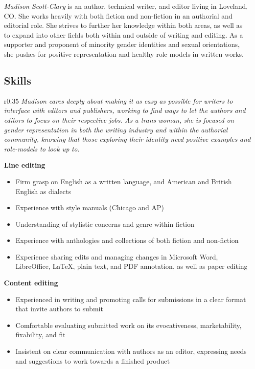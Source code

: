\documentclass[letterpaper]{memoir}
\begin{document}


\textit{\large Madison Scott-Clary} is an author, technical writer, and editor living in Loveland, CO. She works heavily with both fiction and non-fiction in an authorial and editorial role. She strives to further her knowledge within both areas, as well as to expand into other fields both within and outside of writing and editing. As a supporter and proponent of minority gender identities and sexual orientations, she pushes for positive representation and healthy role models in written works.

\subsection{Skills}

\begin{wrapfigure}{r}{0.35\linewidth}
  \textit{\color{titlegreydark} \large Madison cares deeply about making it as easy as possible for writers to interface with editors and publishers, working to find ways to let the authors and editors to focus on their respective jobs. As a trans woman, she is focused on gender representation in both the writing industry and within the authorial community, knowing that those exploring their identity need positive examples and role-models to look up to.}
  \vspace{-1in}
\end{wrapfigure}

\textbf{Line editing}

\begin{itemize}
  \item Firm grasp on English as a written language, and American and British English as dialects
  \item Experience with style manuals (Chicago and AP)
  \item Understanding of stylistic concerns and genre within fiction
  \item Experience with anthologies and collections of both fiction and non-fiction
  \item Experience sharing edits and managing changes in Microsoft Word, LibreOffice, \LaTeX, plain text, and PDF annotation, as well as paper editing
\end{itemize}

\hspace{-1.5em}\textbf{Content editing}

\begin{itemize}
  \item Experienced in writing and promoting calls for submissions in a clear format that invite authors to submit
  \item Comfortable evaluating submitted work on its evocativeness, marketability, fixability, and fit
  \item Insistent on clear communication with authors as an editor, expressing needs and suggestions to work towards a finished product
\end{itemize}
\end{document}
